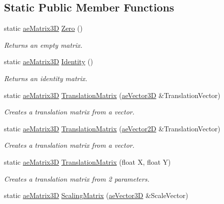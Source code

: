 \subsection*{Static Public Member Functions}
\begin{DoxyCompactItemize}
\item 
static \hyperlink{structae_core_1_1ae_matrix3_d}{ae\+Matrix3D} \hyperlink{structae_core_1_1ae_matrix3_d_a782cb818727660d8f4328ab1cd144f1c}{Zero} ()
\begin{DoxyCompactList}\small\item\em Returns an empty matrix. \end{DoxyCompactList}\item 
static \hyperlink{structae_core_1_1ae_matrix3_d}{ae\+Matrix3D} \hyperlink{structae_core_1_1ae_matrix3_d_a11ea5cdf0bab15196698f30e995f6c9f}{Identity} ()
\begin{DoxyCompactList}\small\item\em Returns an identity matrix. \end{DoxyCompactList}\item 
static \hyperlink{structae_core_1_1ae_matrix3_d}{ae\+Matrix3D} \hyperlink{structae_core_1_1ae_matrix3_d_ad1030c57e41353a6bbd119a8c18cff04}{Translation\+Matrix} (\hyperlink{structae_core_1_1ae_vector3_d}{ae\+Vector3D} \&Translation\+Vector)
\begin{DoxyCompactList}\small\item\em Creates a translation matrix from a vector. \end{DoxyCompactList}\item 
static \hyperlink{structae_core_1_1ae_matrix3_d}{ae\+Matrix3D} \hyperlink{structae_core_1_1ae_matrix3_d_a332e3c17fde2576cd33f3278af1cf074}{Translation\+Matrix} (\hyperlink{structae_core_1_1ae_vector2_d}{ae\+Vector2D} \&Translation\+Vector)
\begin{DoxyCompactList}\small\item\em Creates a translation matrix from a vector. \end{DoxyCompactList}\item 
static \hyperlink{structae_core_1_1ae_matrix3_d}{ae\+Matrix3D} \hyperlink{structae_core_1_1ae_matrix3_d_a3aa74d0ca7c2b9eac8a75794b2cda0e0}{Translation\+Matrix} (float X, float Y)
\begin{DoxyCompactList}\small\item\em Creates a translation matrix from 2 parameters. \end{DoxyCompactList}\item 
static \hyperlink{structae_core_1_1ae_matrix3_d}{ae\+Matrix3D} \hyperlink{structae_core_1_1ae_matrix3_d_a20285a4288152552358cce6f22229c6d}{Scaling\+Matrix} (\hyperlink{structae_core_1_1ae_vector3_d}{ae\+Vector3D} \&Scale\+Vector)

\end{DoxyCompactItemize}
